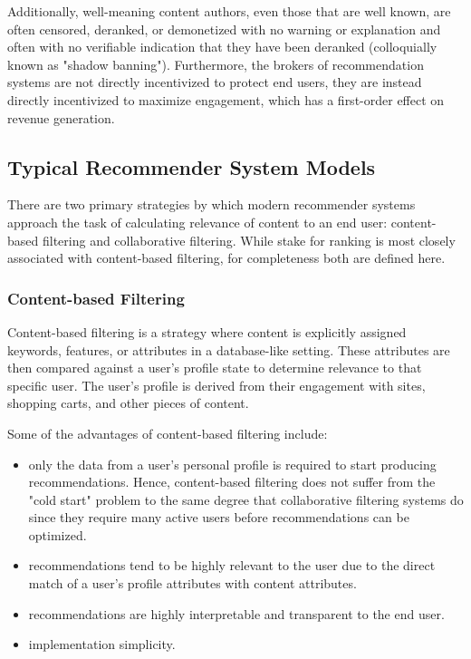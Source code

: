 Additionally, well-meaning content authors, even those that are well known, are often censored, deranked, or demonetized with no warning or explanation and often with no verifiable indication that they have been deranked (colloquially known as "shadow banning"). Furthermore, the brokers of recommendation systems are not directly incentivized to protect end users, they are instead directly incentivized to maximize engagement, which has a first-order effect on revenue generation. 

\subsection{Typical Recommender System Models}

There are two primary strategies by which modern recommender systems approach the task of calculating relevance of content to an end user: content-based filtering and collaborative filtering. While stake for ranking is most closely associated with content-based filtering, for completeness both are defined here. 

\subsubsection{Content-based Filtering}

Content-based filtering is a strategy where content is explicitly assigned keywords, features, or attributes in a database-like setting. These attributes are then compared against a user's profile state to determine relevance to that specific user. The user's profile is derived from their engagement with sites, shopping carts, and other pieces of content. 

Some of the advantages of content-based filtering include:
\begin{itemize}
    \item only the data from a user's personal profile is required to start producing recommendations. Hence, content-based filtering does not suffer from the "cold start" problem to the same degree that collaborative filtering systems do since they require many active users before recommendations can be optimized. 
    \item recommendations tend to be highly relevant to the user due to the direct match of a user's profile attributes with content attributes.
    \item recommendations are highly interpretable and transparent to the end user. 
    \item implementation simplicity. 
\end{itemize}

